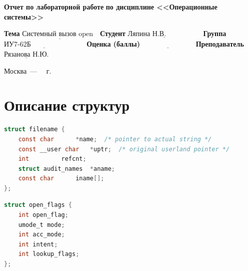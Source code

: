 \documentclass[12pt]{report}
\begin{document}
\begin{titlepage}
		\begin{center}
			\noindent\begin{minipage}{1.1\textwidth}\centering
				\Large\textbf{  Отчет по лабораторной работе }\newline
				\textbf{по дисциплине <<Операционные системы>>}\newline
			\end{minipage}
		\end{center}
		
		\noindent\textbf{Тема} $\underline{\text{Системный вызов open~~}}$\newline\newline
		\noindent\textbf{Студент} $\underline{\text{Ляпина Н.В.~~~~~~~~~~~~~~~}}$\newline\newline
		\noindent\textbf{Группа} $\underline{\text{ИУ7-62Б~~~~~~~~~~~~~~~~~~~~~~~}}$\newline\newline
		\noindent\textbf{Оценка (баллы)} $\underline{\text{~~~~~~~~~~~~~~~~~~~~~~}}$\newline\newline
		\noindent\textbf{Преподаватель} $\underline{\text{Рязанова Н.Ю.}}$\newline\newline\newline
		
		\begin{center}
			\vfill
			Москва~---~\the\year
			~г.
		\end{center}
	\end{titlepage}
\setcounter{page}{2}

\section*{Описание структур}

\begin{lstlisting}[label=first,caption=Структура struct filename, language=C]
struct filename {
	const char		*name;	/* pointer to actual string */
	const __user char	*uptr;	/* original userland pointer */
	int			refcnt;
	struct audit_names	*aname;
	const char		iname[];
};
\end{lstlisting}

\begin{lstlisting}[label=first,caption=Структура struct open\_flags, language=C]
struct open_flags {
	int open_flag;
	umode_t mode;
	int acc_mode;
	int intent;
	int lookup_flags;
};
\end{lstlisting}
\end{document}
